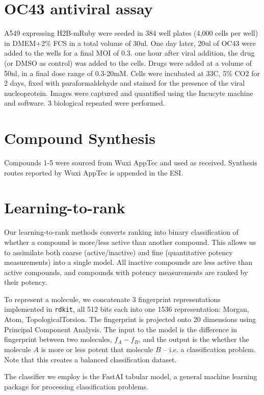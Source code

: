 \documentclass[12pt,aps,showpacs,superscriptaddress,footinbib,preprint,noshowpacs]{revtex4-1}
\begin{document}
\section{OC43 antiviral assay}

A549 expressing H2B-mRuby were seeded in 384 well plates (4,000 cells per well) in DMEM+2\% FCS in a total volume of 30ul. One day later, 20ul of OC43 were added to the wells for a final MOI of 0.3. one hour after viral addition, the drug (or DMSO as control) was added to the cells. Drugs were added at a volume of 50nl, in a final dose range of 0.3-20mM. Cells were incubated at 33C, 5\% CO2 for 2 days, fixed with paraformaldehyde and stained for the presence of the viral nucleoprotein. Images were captured and quantified using the Incucyte machine and software. 3 biological repeated were performed.

\section{Compound Synthesis}

Compounds 1-5 were sourced from Wuxi AppTec and used as received. Synthesis routes reported by Wuxi AppTec is appended in the ESI. 


\section{Learning-to-rank} 

Our learning-to-rank methods converts ranking into binary classification of whether a compound is more/less active than another compound. This allows us to assimilate both coarse (active/inactive) and fine (quantitative potency measurements) into a single model. All inactive compounds are less active than active compounds, and compounds with potency measurements are ranked by their potency.  

To represent a molecule, we concatenate 3 fingerprint representations implemented in \texttt{rdkit}, all 512 bits each into one 1536 representation: Morgan, Atom, TopologicalTorsion. The fingerprint is projected onto 20 dimensions using Principal Component Analysis. The input to the model is the difference in fingerprint between two molecules, $f_A - f_B$, and the output is the whether the molecule $A$ is more or less potent that molecule $B$ -- i.e. a classification problem. Note that this creates a balanced classification dataset.  

The classifier we employ is the FastAI tabular model, a general machine learning package for processing classification problems. 
\end{document}

